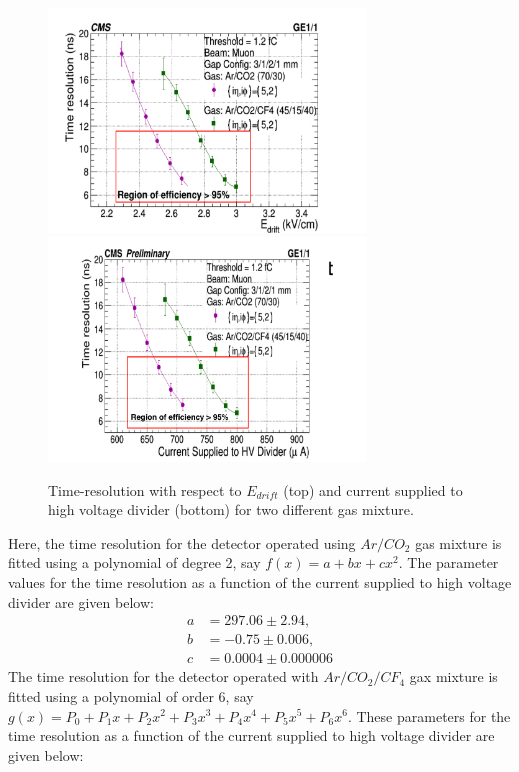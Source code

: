 \begin{figure}[!htbp]
\centering
\includegraphics[width=0.75\textwidth]{figures/GEM/TimeResolution_Edrift.pdf}\\
\includegraphics[width=0.75\textwidth]{figures/GEM/TimeResolution_Current.pdf}\\
\caption{Time-resolution with respect to $E_{drift}$ (top) and current supplied to high voltage divider (bottom) for two different gas mixture.}
\label{TimeResolution}
\end{figure}
Here, the time resolution for the detector operated using $Ar/CO_2$ gas mixture is fitted using a polynomial of degree 2, say $f(x) = a + bx + cx^2$. The parameter values for the time resolution as a function of the current supplied to high voltage divider are given below:
\begin{align*}
    a & =  297.06 \pm 2.94,  \nonumber \\
    b & =  -0.75 \pm 0.006,  \nonumber \\
    c & =  0.0004 \pm 0.000006 \nonumber 
\end{align*}
The time resolution for the detector operated with $Ar/CO_2/CF_4$ gax mixture is fitted using a polynomial of order 6, say $g(x) = P_0 + P_1x + P_2x^2 + P_3x^3 + P_4x^4 + P_5x^5 + P_6x^6$. These parameters for the time resolution as a function of the current supplied to high voltage divider are given below:
